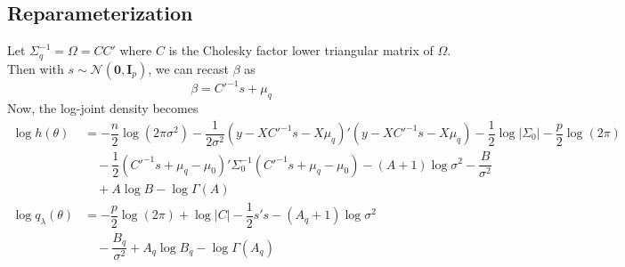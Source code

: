 \documentclass[12pt]{article}
\begin{document}
\subsection{Reparameterization}
Let $\Sigma_{q}^{-1}=\Omega=CC'$ where $C$ is the Cholesky factor lower triangular matrix of $\Omega$. Then with $s\sim \mathscr{N}\left(\mathbf{0},\mathbf{I}_{p}\right)$, we can recast $\beta$ as
\begin{equation}
  \beta = {C'}^{-1}s+\mu_{q}
\end{equation}
Now, the log-joint density becomes
\begin{align}
  \log h(\theta) &= -\dfrac{n}{2}\log\left(2\pi\sigma^{2}\right)-\dfrac{1}{2\sigma^{2}}\left(y-X{C'}^{-1}s-X\mu_{q}\right)'\left(y-X{C'}^{-1}s-X\mu_{q}\right)-\dfrac{1}{2}\log\left|\Sigma_{0}\right|-\dfrac{p}{2}\log(2\pi)\\
  &\quad -\dfrac{1}{2}\left({C'}^{-1}s+\mu_{q}-\mu_{0}\right)'\Sigma_{0}^{-1}\left({C'}^{-1}s+\mu_{q}-\mu_{0}\right)-(A+1)\log\sigma^{2}-\dfrac{B}{\sigma^{2}}\\
  &\quad +A\log B-\log\Gamma(A)\\
  \log q_{\lambda}(\theta) &= -\dfrac{p}{2}\log(2\pi)+\log|C|-\dfrac{1}{2}s's-(A_{q}+1)\log\sigma^{2}\\
  &\quad -\dfrac{B_{q}}{\sigma^{2}}+A_{q}\log B_{q}-\log\Gamma \left(A_{q}\right)
\end{align}
\end{document}

